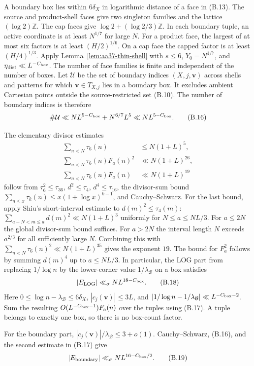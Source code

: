 A boundary box lies within $6\delta_X$ in logarithmic distance of a
face in (B.13). The source and product-shell faces give two singleton
families and the lattice $(\log2)\mathbb Z$. The cap faces give
$\log2+(\log2/3)\mathbb Z$. In each boundary tuple, an active
coordinate is at least $N^{1/7}$ for large $N$. For a product face,
the largest of at most six factors is at least
$(H/2)^{1/6}$. On a cap face the capped factor is at least
$(H/4)^{1/3}$. Apply Lemma~\ref{lem:aa37-thin-shell} with
$s\le6$, $Y_0=N^{1/7}$, and
$\eta_{\rm dist}\ll L^{-C_{\rm box}}$. The number of face families is
finite and independent of the number of boxes. Let $\mathcal U$ be the
set of boundary indices $(X,j,\mathbf v)$ across shells and patterns
for which $\mathbf v\in T_{X,j}$ lies in a boundary box. It excludes
ambient Cartesian points outside the source-restricted set (B.10).
The number of boundary indices is therefore
\[
 \#\mathcal U\ll N L^{5-C_{\rm box}}+N^{6/7}L^5
 \ll N L^{5-C_{\rm box}}.
 \tag{B.16}
\]

The elementary divisor estimates
\[
 \begin{aligned}
 \sum_{n<N}\tau_6(n)&\le N(1+L)^5,\\
 \sum_{n<N}\tau_6(n)F_a(n)^2&\ll N(1+L)^{26},\\
 \sum_{n<N}\tau_6(n)F_a(n)&\ll N(1+L)^{19}
 \end{aligned}
 \tag{B.17}
\]
follow from $\tau_6^2\le\tau_{36}$,
$d^2\le\tau_4$, $d^4\le\tau_{16}$, the divisor-sum bound
$\sum_{n\le x}\tau_k(n)\le x(1+\log x)^{k-1}$, and
Cauchy--Schwarz. For the last bound, apply Shiu's short-interval
estimate \cite{Shiu80} to $d(m)^2\le\tau_4(m)$:
$\sum_{a-N<m\le a}d(m)^2\ll N(1+L)^3$ uniformly for
$N\le a\le NL/3$. For $a\le2N$ the global divisor-sum bound
suffices. For $a>2N$ the interval length $N$ exceeds $a^{2/3}$
for all sufficiently large $N$. Combining this with
$\sum_{n<N}\tau_6(n)^2\ll N(1+L)^{35}$ gives the exponent $19$.
The bound for $F_a^2$ follows by summing $d(m)^4$ up to $a\le NL/3$.
In particular, the LOG part from
replacing
$1/\log n$ by the lower-corner value $1/\lambda_{\mathcal B}$ on a
box satisfies
\[
 \left|E_{\rm LOG}\right|\ll_\sigma NL^{18-C_{\rm box}}.
 \tag{B.18}
\]
Here $0\le\log n-\lambda_{\mathcal B}\le6\delta_X$,
$|c_j(\mathbf v)|\le3L$, and
$|1/\log n-1/\lambda_{\mathcal B}|\ll L^{-C_{\rm box}-2}$.
Sum the resulting $O(L^{-C_{\rm box}-1})F_a(n)$ over the tuples using
(B.17). A tuple belongs to exactly one box, so there is no box-count
factor.

For the boundary part, $|c_j(\mathbf v)|/\lambda_{\mathcal B}
\le3+o(1)$. Cauchy--Schwarz, (B.16), and the second estimate in (B.17)
give
\[
 |E_{\rm boundary}|\ll_\sigma NL^{16-C_{\rm box}/2}.
 \tag{B.19}
\]


